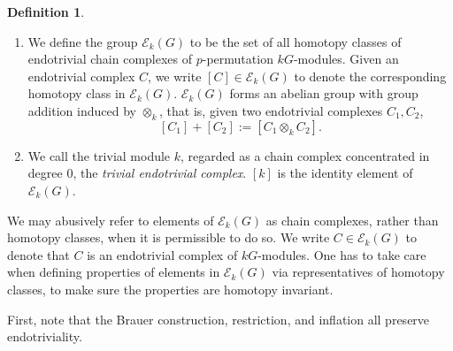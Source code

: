 \documentclass[10pt,letterpaper, boxed, cm]{amsart}
\newcommand{\calE}{\mathcal{E}}
\theoremstyle{remark}
\theoremstyle{definition}
\newtheorem{definition}[theorem]{Definition}
\begin{document}
	\begin{definition}
		\begin{enumerate}
			\item We define the group $\calE_k(G)$ to be the set of all homotopy classes of endotrivial chain complexes of $p$-permutation $kG$-modules. Given an endotrivial complex $C$, we write $[C]\in \calE_k(G)$ to denote the corresponding homotopy class in $\calE_k(G)$. $\calE_k(G)$ forms an abelian group with group addition induced by $\otimes_k$, that is, given two endotrivial complexes $C_1, C_2$, \[[C_1] + [C_2] := [C_1 \otimes_k C_2].\]

			\item We call the trivial module $k$, regarded as a chain complex concentrated in degree 0, the \textit{trivial endotrivial complex}. $[k]$ is the identity element of $\calE_k(G)$.
		\end{enumerate}
	\end{definition}

	We may abusively refer to elements of $\calE_k(G)$ as chain complexes, rather than homotopy classes, when it is permissible to do so. We write $C \in \calE_k(G)$ to denote that $C$ is an endotrivial complex of $kG$-modules. One has to take care when defining properties of elements in $\calE_k(G)$ via representatives of homotopy classes, to make sure the properties are homotopy invariant.

	First, note that the Brauer construction, restriction, and inflation all preserve endotriviality.
\end{document}
